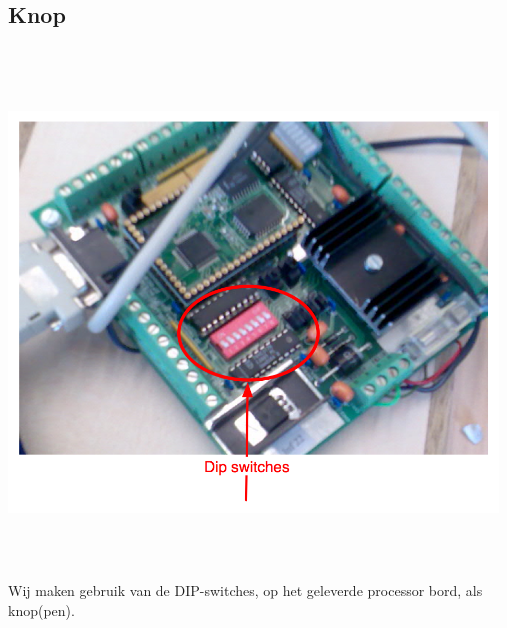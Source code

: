 \subsection{Knop}\label{sub:knop} %
  \includegraphics[width=13cm, height=14cm]{dip} \\
  Wij maken gebruik van de DIP-switches, op het geleverde processor bord, als knop(pen).

